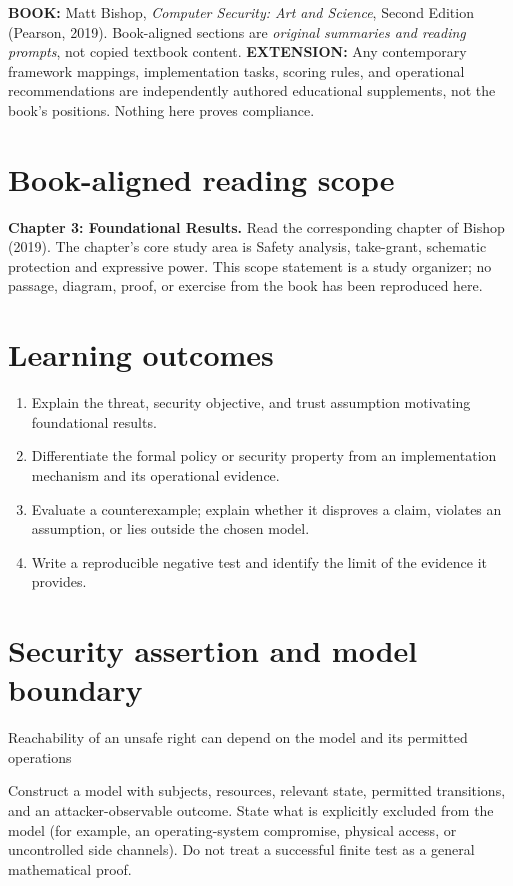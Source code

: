 \documentclass[10pt,letterpaper]{article}
\begin{document}
\makedoctocpage
\begin{notebox}
\textbf{BOOK:} Matt Bishop, \emph{Computer Security: Art and Science}, Second Edition (Pearson, 2019). Book-aligned sections are \emph{original summaries and reading prompts}, not copied textbook content.
\textbf{EXTENSION:} Any contemporary framework mappings, implementation tasks, scoring rules, and operational recommendations are independently authored educational supplements, not the book's positions. Nothing here proves compliance.
\end{notebox}
\section{Book-aligned reading scope}
\textbf{Chapter 3: Foundational Results.} Read the corresponding chapter of Bishop (2019). The chapter's core study area is Safety analysis, take-grant, schematic protection and expressive power. This scope statement is a study organizer; no passage, diagram, proof, or exercise from the book has been reproduced here.
\section{Learning outcomes}
\begin{enumerate}
\item Explain the threat, security objective, and trust assumption motivating foundational results.
\item Differentiate the formal policy or security property from an implementation mechanism and its operational evidence.
\item Evaluate a counterexample; explain whether it disproves a claim, violates an assumption, or lies outside the chosen model.
\item Write a reproducible negative test and identify the limit of the evidence it provides.
\end{enumerate}
\section{Security assertion and model boundary}
\begin{infobox}
Reachability of an unsafe right can depend on the model and its permitted operations
\end{infobox}
Construct a model with subjects, resources, relevant state, permitted transitions, and an attacker-observable outcome. State what is explicitly excluded from the model (for example, an operating-system compromise, physical access, or uncontrolled side channels). Do not treat a successful finite test as a general mathematical proof.
\end{document}
